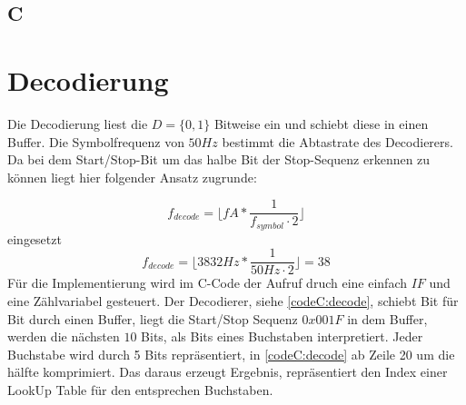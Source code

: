 \documentclass{article}
\begin{document}
\subsection{C}

\section{Decodierung}

Die Decodierung liest die $D = \{0,1\}$ Bitweise ein und schiebt diese in einen Buffer. 
Die Symbolfrequenz von $50Hz$ bestimmt die Abtastrate des Decodierers. Da bei dem Start/Stop-Bit um das
halbe Bit der Stop-Sequenz erkennen zu können liegt hier folgender Ansatz zugrunde:

$$
f_{decode} = \lfloor fA * \frac{1}{f_{symbol} \cdot 2}\rfloor 
$$
eingesetzt
$$
f_{decode} = \lfloor 3832Hz * \frac{1}{50Hz\cdot 2}\rfloor = 38
$$
Für die Implementierung wird im C-Code der Aufruf druch eine einfach $IF$ und eine Zählvariabel
gesteuert. Der Decodierer, siehe \ref{codeC:decode}, schiebt Bit für Bit durch einen Buffer, liegt
die Start/Stop Sequenz $0x001F$ in dem Buffer, werden die nächsten $10$ Bits, als Bits eines Buchstaben interpretiert.
Jeder Buchstabe wird durch 5 Bits repräsentiert, in \ref{codeC:decode} ab Zeile 20 um die hälfte komprimiert.
Das daraus erzeugt Ergebnis, repräsentiert den Index einer LookUp Table für den entsprechen Buchstaben.
\end{document}
